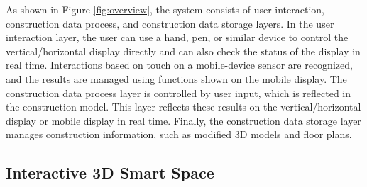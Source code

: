 As shown in Figure \ref{fig:overview}, the system consists of user interaction, construction data process, and construction data storage layers. In the user interaction layer, the user can use a hand, pen, or similar device to control the vertical/horizontal display directly and can also check the status of the display in real time. Interactions based on touch on a mobile-device sensor are recognized, and the results are managed using functions shown on the mobile display. The construction data process layer is controlled by user input, which is reflected in the construction model. This layer reflects these results on the vertical/horizontal display or mobile display in real time. Finally, the construction data storage layer manages construction information, such as modified 3D models and floor plans.

\subsection{Interactive 3D Smart Space}

